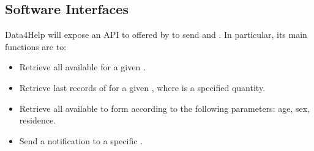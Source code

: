 \documentclass[../../../rasd.tex]{subfiles}
\begin{document}
\subsection{Software Interfaces}
			Data4Help will expose an API to  offered by  to send  and . In particular, its main functions are to:
			\begin{itemize}
				\item Retrieve all  available for a given .
				\item Retrieve last  records of  for a given , where  is a specified quantity.
				\item Retrieve all  available to form  according to the following parameters: age, sex, residence.
				\item Send a notification to a specific .
			\end{itemize}
\end{document}
